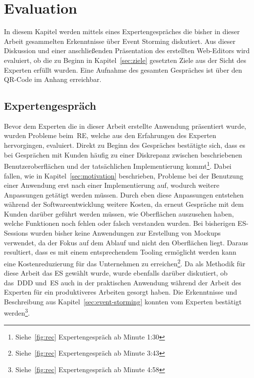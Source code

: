 \chapter{Evaluation}\label{ch:evaluation}
In diesem Kapitel werden mittels eines Expertengespräches die bisher in dieser Arbeit gesammelten Erkenntnisse über Event Storming diskutiert.
Aus dieser Diskussion und einer anschließenden Präsentation des erstellten Web-Editors wird evaluiert, ob die zu Beginn in Kapitel~\ref{sec:ziele}
gesetzten Ziele aus der Sicht des Experten erfüllt wurden.\newline
Eine Aufnahme des gesamten Gespräches ist über den QR-Code im Anhang erreichbar.

\section{Expertengespräch}\label{sec:expertengespraech}
Bevor dem Experten die in dieser Arbeit erstellte Anwendung präsentiert wurde, wurden Probleme beim~\ac{RE}, welche aus den Erfahrungen des Experten
hervorgingen, evaluiert.
Direkt zu Beginn des Gespräches bestätigte sich, dass es bei Gesprächen mit Kunden häufig zu einer Diskrepanz zwischen beschriebenen Benutzeroberflächen und der
tatsächlichen Implementierung kommt\footnote{Siehe~\ref{fig:rec} Expertengespräch ab Minute 1:30}.
Dabei fallen, wie in Kapitel~\ref{sec:motivation} beschrieben, Probleme bei der Benutzung einer Anwendung erst nach einer Implementierung auf, wodurch
weitere Anpassungen getätigt werden müssen.
Durch eben diese Anpassungen entstehen während der Softwareentwicklung weitere Kosten, da erneut Gespräche mit dem Kunden darüber geführt werden müssen,
wie Oberflächen auszusehen haben, welche Funktionen noch fehlen oder falsch verstanden wurden.
Bei bisherigen \ac{ES}-Sessions wurden bisher keine Anwendungen zur Erstellung von Mockups verwendet, da der Fokus auf dem Ablauf und nicht den Oberflächen liegt.
Daraus resultiert, dass es mit einem entsprechendem Tooling ermöglicht werden kann eine Kostenreduzierung für das Unternehmen zu erreichen\footnote{Siehe~\ref{fig:rec} Expertengespräch ab Minute  3:43}.\newline
Da als Methodik für diese Arbeit das \ac{ES} gewählt wurde, wurde ebenfalls darüber diskutiert, ob das~\ac{DDD} und~\ac{ES} auch in der praktischen
Anwendung während der Arbeit des Experten für ein produktiveres Arbeiten gesorgt haben.
Die Erkenntnisse und Beschreibung aus Kapitel~\ref{sec:event-storming} konnten vom Experten bestätigt werden\footnote{Siehe~\ref{fig:rec} Expertengespräch ab Minute  4:58}.
